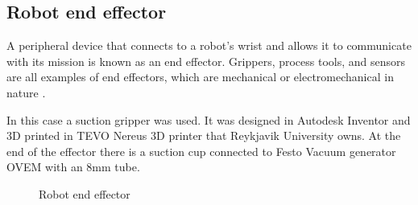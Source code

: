 
\subsection{Robot end effector\label{subsec:robotend}}
A peripheral device that connects to a robot's wrist and allows it to communicate with its mission is known as an end effector. Grippers, process tools, and sensors are all examples of end effectors, which are mechanical or electromechanical in nature \cite{wilson_relative_1996}. 

In this case a suction gripper was used. It was designed in Autodesk Inventor \cite{noauthor_inventor_nodate} and 3D printed in TEVO Nereus 3D printer that Reykjavik University owns. At the end of the effector there is a suction cup connected to Festo Vacuum generator OVEM with an 8mm tube.
\begin{figure}[ht]
    \centering
    \hfill
    \caption{Robot end effector}
    \label{figure: endeffector}
\end{figure}

